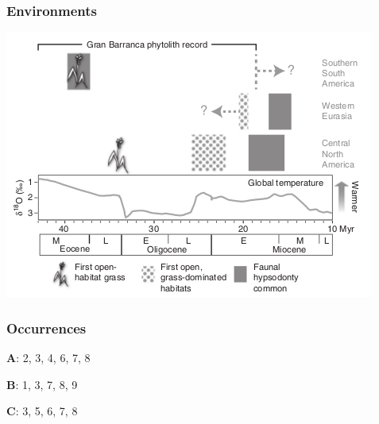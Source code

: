 \documentclass{beamer}
\begin{document}
\begin{frame}
  \frametitle{Environments}

  \includegraphics[height=0.8\textheight,width=\textwidth,keepaspectratio=true]{figure/stromberg}

  \tiny{}
\end{frame}


\begin{frame}
  \frametitle{Occurrences}
  \begin{center}
    \textbf{A}: {2, 3, 4, 6, 7, 8}

    \vspace{0.5cm}

    \textbf{B}: {1, 3, 7, 8, 9}

    \vspace{0.5cm}

    \textbf{C}: {3, 5, 6, 7, 8}
  \end{center}

\end{frame}
\end{document}
